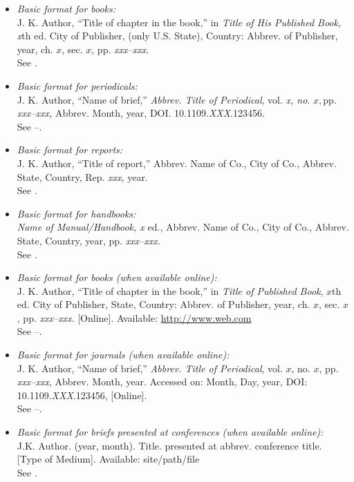 \documentclass{IEEEtran}
\begin{document}
\begin{itemize}

\item \emph{Basic format for books:}\\
J. K. Author, ``Title of chapter in the book,'' in \emph{Title of His Published Book, x}th ed. City of Publisher, (only U.S. State), Country: Abbrev. of Publisher, year, ch. $x$, sec. $x$, pp. \emph{xxx--xxx.}\\
See \cite{b1,b2}.

\item \emph{Basic format for periodicals:}\\
J. K. Author, ``Name of brief,'' \emph{Abbrev. Title of Periodical}, vol. \emph{x, no}. $x, $pp\emph{. xxx--xxx, }Abbrev. Month, year, DOI. 10.1109.\emph{XXX}.123456.\\
See \cite{b3}--\cite{b5}.

\item \emph{Basic format for reports:}\\
J. K. Author, ``Title of report,'' Abbrev. Name of Co., City of Co., Abbrev. State, Country, Rep. \emph{xxx}, year.\\
See \cite{b6,b7}.

\item \emph{Basic format for handbooks:}\\
\emph{Name of Manual/Handbook, x} ed., Abbrev. Name of Co., City of Co., Abbrev. State, Country, year, pp. \emph{xxx--xxx.}\\
See \cite{b8,b9}.

\item \emph{Basic format for books (when available online):}\\
J. K. Author, ``Title of chapter in the book,'' in \emph{Title of
Published Book}, $x$th ed. City of Publisher, State, Country: Abbrev.
of Publisher, year, ch. $x$, sec. $x$, pp. \emph{xxx--xxx}. [Online].
Available: \underline{http://www.web.com}\\
See \cite{b10}--\cite{b13}.

\item \emph{Basic format for journals (when available online):}\\
J. K. Author, ``Name of brief,'' \emph{Abbrev. Title of Periodical}, vol. $x$, no. $x$, pp. \emph{xxx--xxx}, Abbrev. Month, year. Accessed on: Month, Day, year, DOI: 10.1109.\emph{XXX}.123456, [Online].\\
See \cite{b14}--\cite{b16}.

\item \emph{Basic format for briefs presented at conferences (when available online): }\\
J.K. Author. (year, month). Title. presented at abbrev. conference title. [Type of Medium]. Available: site/path/file\\
See \cite{b17}.


\end{itemize}
\end{document}
